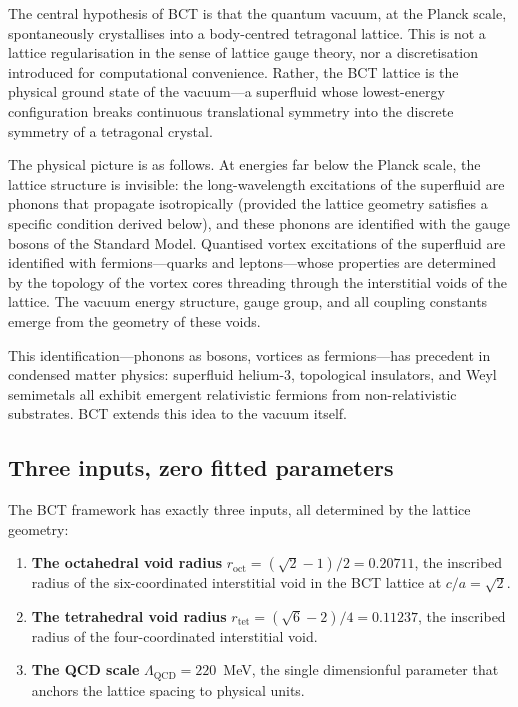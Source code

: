 \documentclass[review,number,sort&compress]{elsarticle}
\newcommand{\roct}{r_{\mathrm{oct}}}
\newcommand{\rtet}{r_{\mathrm{tet}}}
\newcommand{\LQCD}{\Lambda_{\mathrm{QCD}}}
\begin{document}
The central hypothesis of BCT is that the quantum vacuum, at the Planck scale,
spontaneously crystallises into a body-centred tetragonal lattice. This is not a
lattice regularisation in the sense of lattice gauge theory, nor a discretisation
introduced for computational convenience. Rather, the BCT lattice is the physical
ground state of the vacuum---a superfluid whose lowest-energy configuration breaks
continuous translational symmetry into the discrete symmetry of a tetragonal crystal.

The physical picture is as follows. At energies far below the Planck scale, the
lattice structure is invisible: the long-wavelength excitations of the superfluid
are phonons that propagate isotropically (provided the lattice geometry satisfies
a specific condition derived below), and these phonons are identified with the
gauge bosons of the Standard Model. Quantised vortex excitations of the superfluid
are identified with fermions---quarks and leptons---whose properties are determined
by the topology of the vortex cores threading through the interstitial voids of the
lattice. The vacuum energy structure, gauge group, and all coupling constants emerge
from the geometry of these voids.

This identification---phonons as bosons, vortices as fermions---has precedent in
condensed matter physics: superfluid helium-3, topological insulators, and
Weyl semimetals all exhibit emergent relativistic fermions from non-relativistic
substrates. BCT extends this idea to the vacuum itself.

\subsection{Three inputs, zero fitted parameters}

The BCT framework has exactly three inputs, all determined by the lattice geometry:

\begin{enumerate}
\item \textbf{The octahedral void radius}
$\roct = (\sqrt{2}-1)/2 = 0.20711$, the inscribed radius of the
six-coordinated interstitial void in the BCT lattice at $c/a = \sqrt{2}$.

\item \textbf{The tetrahedral void radius}
$\rtet = (\sqrt{6}-2)/4 = 0.11237$, the inscribed radius of the
four-coordinated interstitial void.

\item \textbf{The QCD scale} $\LQCD = 220$~MeV, the single dimensionful
parameter that anchors the lattice spacing to physical units.
\end{enumerate}
\end{document}
